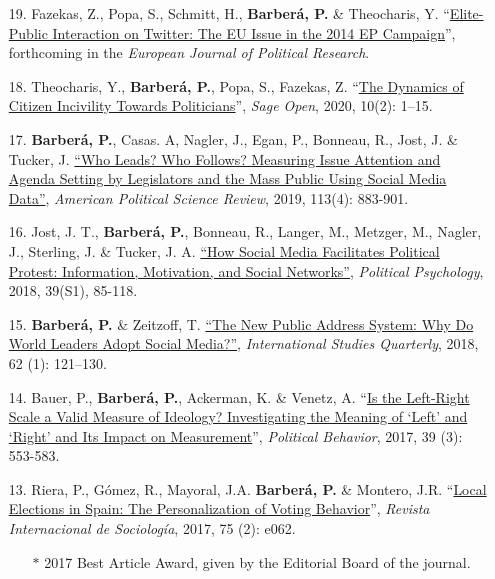 \documentclass[margin,line,11pt]{resume}
\begin{document}
\begin{resume}
\begin{itemize}[leftmargin=5.5mm]
\item[19.] 
Fazekas, Z., Popa, S., Schmitt, H., \textbf{Barber\'{a}, P.} \& Theocharis, Y. ``\href{https://ejpr.onlinelibrary.wiley.com/doi/abs/10.1111/1475-6765.12402}{Elite-Public Interaction on Twitter: The EU Issue in the 2014 EP Campaign}'', forthcoming in the \textit{European Journal of Political Research}.

\item[18.] Theocharis, Y., \textbf{Barber\'{a}, P.}, Popa, S., Fazekas, Z. ``\href{https://journals.sagepub.com/doi/full/10.1177/2158244020919447}{The Dynamics of Citizen Incivility Towards Politicians}'', \textit{Sage Open}, 2020, 10(2): 1--15.

\item[17.] \textbf{Barber\'{a}, P.}, Casas. A, Nagler, J., Egan, P., Bonneau, R., Jost, J. \& Tucker, J. \href{https://t.co/6KnjCczsqH}{``Who Leads? Who Follows? Measuring Issue Attention and Agenda Setting by Legislators and the Mass Public Using Social Media Data''}, \textit{American Political Science Review}, 2019, 113(4): 883-901.

\item[16.] Jost, J. T., \textbf{Barber\'{a}, P.}, Bonneau, R., Langer, M., Metzger, M., Nagler, J., Sterling, J. \& Tucker, J. A. \href{http://onlinelibrary.wiley.com/doi/10.1111/pops.12478/full}{``How Social Media Facilitates Political Protest: Information, Motivation, and Social Networks''}, \textit{Political Psychology}, 2018, 39(S1), 85-118.

\newpage   
  
\item[15.] \textbf{Barber\'{a}, P.} \& Zeitzoff, T. \href{https://academic.oup.com/isq/article/doi/10.1093/isq/sqx047/4430887/The-New-Public-Address-System-Why-Do-World-Leaders}{``The New Public Address System: Why Do World Leaders Adopt Social Media?''}, \textit{International Studies Quarterly}, 2018, 62 (1): 121--130.
    
\item[14.] Bauer, P., \textbf{Barber\'{a}, P.}, Ackerman, K. \& Venetz, A. ``\href{http://link.springer.com/article/10.1007/s11109-016-9368-2}{Is the Left-Right Scale a Valid Measure of Ideology? Investigating the Meaning of `Left' and `Right' and Its Impact on Measurement}'', \textit{Political Behavior}, 2017, 39 (3): 553-583.

\item[13.] Riera, P., G\'{o}mez, R., Mayoral, J.A. \textbf{Barber\'{a}, P.} \& Montero, J.R. ``\href{http://revintsociologia.revistas.csic.es/index.php/revintsociologia/article/view/675/832}{Local Elections in Spain: The Personalization of Voting Behavior}'', \textit{Revista Internacional de Sociolog\'{i}a}, 2017, 75 (2): e062.
\begin{itemize}
\item[] $\ast$ 2017 Best Article Award, given by the Editorial Board of the journal.
\end{itemize}


\end{itemize}
\end{resume}
\end{document}
